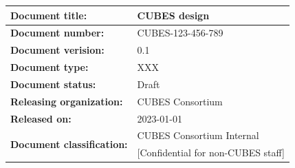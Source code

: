 \documentclass[12pt,a4paper]{article}
\begin{document}
\begin{center}
  \begin{tabular}{ l l }
    \hline
        {\bf Document title:}          & {\bf CUBES design}                       \\ \hline
        {\bf Document number:}         & CUBES-123-456-789                        \\ \hline
        {\bf Document verision:}       & 0.1                                      \\ \hline
        {\bf Document type:}           & XXX                                      \\ \hline
        {\bf Document status:}         & Draft                                    \\ \hline
        {\bf Releasing organization:}  & CUBES Consortium                         \\ \hline
        {\bf Released on:}             & 2023-01-01                               \\ \hline
        \multirow{2}{*}{\bf Document classification:} & CUBES Consortium Internal \\
                                       & [Confidential for non-CUBES staff]       \\ \hline
  \end{tabular}
\end{center}

\vfill
\end{document}
